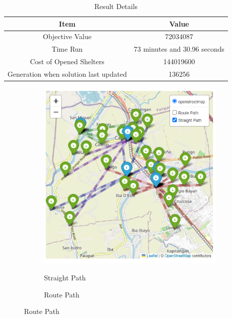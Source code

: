 	\begin{table}[h!]
		\centering
		\caption{Result Details}
		\label{resdetails}
		\begin{tabular}{|c|c|}
			\hline
			\textbf{Item} & \textbf{Value} \\ \hline
			Objective Value & 72034087 \\ 
			Time Run  & 73 minutes and 30.96 seconds \\ 
			Cost of Opened Shelters & 144019600 \\ 
			Generation when solution last updated & 136256 \\ \hline
		\end{tabular}
	\end{table}
	
	\begin{figure}[h!]
		\centering
		\caption{Community to Shelter Paths}
		\begin{subfigure}{0.4\textwidth}
			\caption{Straight Path}
			\centering
			\includegraphics[width=\textwidth]{Chapter 4/straight path}
			\label{straightpath}
		\end{subfigure}
		\hspace{0.5cm}
		\begin{subfigure}{0.4\textwidth}
			\caption{Route Path}
			\centering

\end{subfigure}
\end{figure}
